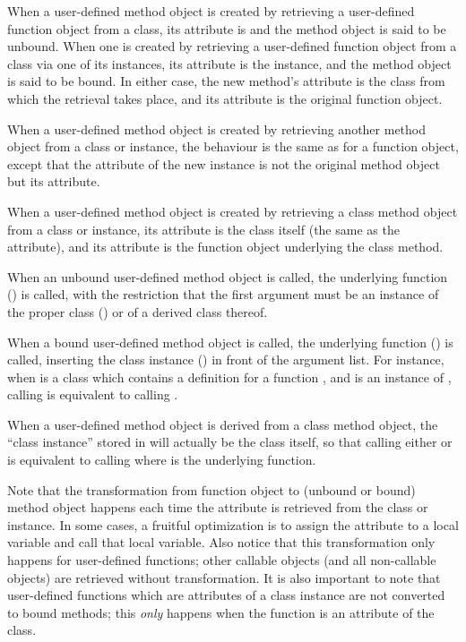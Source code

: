 \begin{description}
\begin{description}
When a user-defined method object is created by retrieving
a user-defined function object from a class, its 
attribute is  and the method object is said to be unbound.
When one is created by retrieving a user-defined function object
from a class via one of its instances, its  attribute
is the instance, and the method object is said to be bound.
In either case, the new method's  attribute
is the class from which the retrieval takes place, and
its  attribute is the original function object.

When a user-defined method object is created by retrieving another
method object from a class or instance, the behaviour is the same
as for a function object, except that the  attribute
of the new instance is not the original method object but its
 attribute.

When a user-defined method object is created by retrieving a
class method object from a class or instance, its 
attribute is the class itself (the same as the 
attribute), and its  attribute is the function
object underlying the class method.

When an unbound user-defined method object is called, the underlying
function () is called, with the restriction that the
first argument must be an instance of the proper class
() or of a derived class thereof.

When a bound user-defined method object is called, the underlying
function () is called, inserting the class instance
() in front of the argument list.  For instance, when
 is a class which contains a definition for a function
, and  is an instance of , calling
 is equivalent to calling .

When a user-defined method object is derived from a class method object,
the ``class instance'' stored in  will actually be the
class itself, so that calling either  or  is
equivalent to calling  where  is the underlying
function.

Note that the transformation from function object to (unbound or
bound) method object happens each time the attribute is retrieved from
the class or instance.  In some cases, a fruitful optimization is to
assign the attribute to a local variable and call that local variable.
Also notice that this transformation only happens for user-defined
functions; other callable objects (and all non-callable objects) are
retrieved without transformation.  It is also important to note that
user-defined functions which are attributes of a class instance are
not converted to bound methods; this \emph{only} happens when the
function is an attribute of the class.


\end{description}
\end{description}
